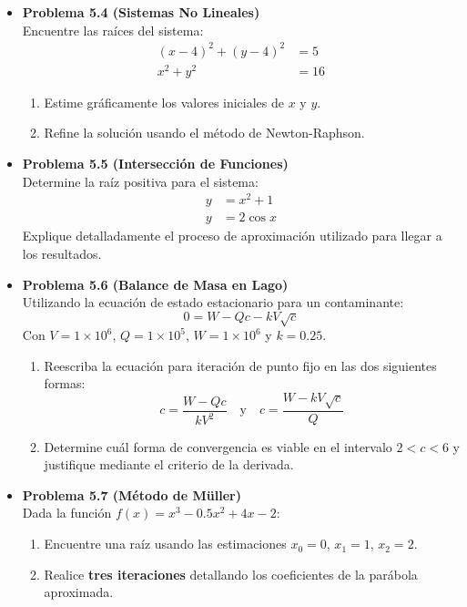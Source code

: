 \documentclass[12pt,letterpaper]{article}
\begin{document}
\begin{itemize}
    \vspace{0.3cm}
    \item \textbf{Problema 5.4 (Sistemas No Lineales)} \\
    Encuentre las raíces del sistema:
    \begin{align*}
        (x - 4)^2 + (y - 4)^2 &= 5 \\
        x^2 + y^2 &= 16
    \end{align*}
    \begin{enumerate}
        \item Estime gráficamente los valores iniciales de $x$ y $y$.
        \item Refine la solución usando el método de Newton-Raphson.
    \end{enumerate}

    \vspace{0.3cm}
    \item \textbf{Problema 5.5 (Intersección de Funciones)} \\
    Determine la raíz positiva para el sistema:
    \begin{align*}
        y &= x^2 + 1 \\
        y &= 2 \cos x
    \end{align*}
    Explique detalladamente el proceso de aproximación utilizado para llegar a los resultados.

    \vspace{0.3cm}
    \item \textbf{Problema 5.6 (Balance de Masa en Lago)} \\
    Utilizando la ecuación de estado estacionario para un contaminante:
    \[
    0 = W - Qc - kV \sqrt{c}
    \]
    Con $V = 1 \times 10^6$, $Q = 1 \times 10^5$, $W = 1 \times 10^6$ y $k = 0.25$.
    \begin{enumerate}
        \item Reescriba la ecuación para iteración de punto fijo en las dos siguientes formas:
        \[
        c = \frac{W - Qc}{kV^2} \quad \text{y} \quad c = \frac{W - kV \sqrt{c}}{Q}
        \]
        \item Determine cuál forma de convergencia es viable en el intervalo $2 < c < 6$ y justifique mediante el criterio de la derivada.
    \end{enumerate}

    \vspace{0.3cm}
    \item \textbf{Problema 5.7 (Método de Müller)} \\
    Dada la función $f(x) = x^3 - 0.5x^2 + 4x - 2$:
    \begin{enumerate}
        \item Encuentre una raíz usando las estimaciones $x_0 = 0$, $x_1 = 1$, $x_2 = 2$.
        \item Realice \textbf{tres iteraciones} detallando los coeficientes de la parábola aproximada.
    \end{enumerate}


\end{itemize}
\end{document}
